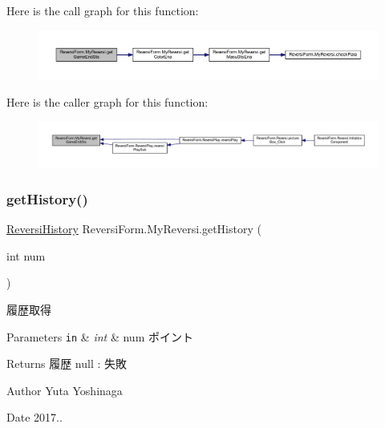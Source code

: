 Here is the call graph for this function\+:
\nopagebreak
\begin{figure}[H]
\begin{center}
\leavevmode
\includegraphics[width=350pt]{class_reversi_form_1_1_my_reversi_aa39c8c111afeb4ea3bf2befbd9f1434b_cgraph}
\end{center}
\end{figure}
Here is the caller graph for this function\+:
\nopagebreak
\begin{figure}[H]
\begin{center}
\leavevmode
\includegraphics[width=350pt]{class_reversi_form_1_1_my_reversi_aa39c8c111afeb4ea3bf2befbd9f1434b_icgraph}
\end{center}
\end{figure}
\mbox{\label{class_reversi_form_1_1_my_reversi_a249dba624bda1144c23cc53f68c35c67}} 
\subsubsection{\texorpdfstring{get\+History()}{getHistory()}}
{\footnotesize\ttfamily \hyperlink{class_reversi_form_1_1_reversi_history}{Reversi\+History} Reversi\+Form.\+My\+Reversi.\+get\+History (\begin{DoxyParamCaption}\item[{int}]{num }\end{DoxyParamCaption})}



履歴取得 


\begin{DoxyParams}[1]{Parameters}
\mbox{\tt in}  & {\em int} & num ポイント \\
\hline
\end{DoxyParams}
\begin{DoxyReturn}{Returns}
履歴 null \+: 失敗 
\end{DoxyReturn}
\begin{DoxyAuthor}{Author}
Yuta Yoshinaga 
\end{DoxyAuthor}
\begin{DoxyDate}{Date}
2017.. 
\end{DoxyDate}


